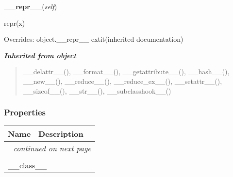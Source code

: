     \vspace{0.5ex}

\hspace{.8\funcindent}\begin{boxedminipage}{\funcwidth}

    \raggedright \textbf{\_\_repr\_\_}(\textit{self})

\setlength{\parskip}{2ex}
    repr(x)

\setlength{\parskip}{1ex}
      Overrides: object.\_\_repr\_\_ 	extit{(inherited documentation)}

    \end{boxedminipage}


\large{\textbf{\textit{Inherited from object}}}

\begin{quote}
\_\_delattr\_\_(), \_\_format\_\_(), \_\_getattribute\_\_(), \_\_hash\_\_(), \_\_new\_\_(), \_\_reduce\_\_(), \_\_reduce\_ex\_\_(), \_\_setattr\_\_(), \_\_sizeof\_\_(), \_\_str\_\_(), \_\_subclasshook\_\_()
\end{quote}


  \subsubsection{Properties}

    \vspace{-1cm}
\hspace{\varindent}\begin{longtable}{|p{\varnamewidth}|p{\vardescrwidth}|l}
\cline{1-2}
\cline{1-2} \centering \textbf{Name} & \centering \textbf{Description}& \\
\cline{1-2}
\endhead\cline{1-2}\multicolumn{3}{r}{\small\textit{continued on next page}}\\\endfoot\cline{1-2}
\endlastfoot\multicolumn{2}{|l|}{\textit{Inherited from object}}\\
\multicolumn{2}{|p{\varwidth}|}{\raggedright \_\_class\_\_}\\
\cline{1-2}
\end{longtable}



